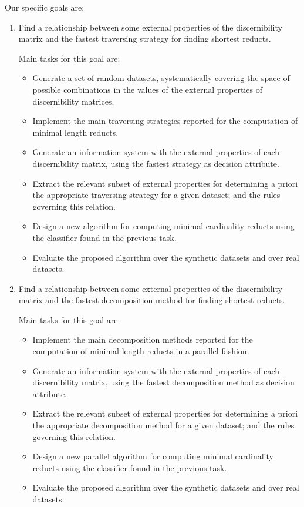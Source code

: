 \documentclass[11pt]{article}   %
\begin{document}
  Our specific goals are:
  \begin{enumerate}
  \item Find a relationship between some external properties of the discernibility matrix and the fastest 
  		traversing strategy for finding shortest reducts.
  		
  		Main tasks for this goal are:
  		\begin{itemize}
  		\item Generate a set of random datasets, systematically covering the space of possible combinations in 
  			  the values of the external properties of discernibility matrices.
  		\item Implement the main traversing strategies reported for the computation of minimal length reducts.
  		\item Generate an information system with the external properties of each discernibility matrix, using 
  			  the fastest strategy as decision attribute.
  		\item Extract the relevant subset of external properties for determining a priori the appropriate 
  			  traversing strategy for a given dataset; and the rules governing this relation.
  		\item Design a new algorithm for computing minimal cardinality reducts using the classifier found in
  			  the previous task.
  		\item Evaluate the proposed algorithm over the synthetic datasets and over real datasets.
  		\end{itemize}
  	
  \item Find a relationship between some external properties of the discernibility matrix and the fastest 
  		decomposition method for finding shortest reducts.
  		
  		Main tasks for this goal are:
  		\begin{itemize}
  		\item Implement the main decomposition methods reported for the computation of minimal length reducts
  			  in a parallel fashion.
  		\item Generate an information system with the external properties of each discernibility matrix, using 
  			  the fastest decomposition method as decision attribute.
  		\item Extract the relevant subset of external properties for determining a priori the appropriate 
  			  decomposition method for a given dataset; and the rules governing this relation.
  		\item Design a new parallel algorithm for computing minimal cardinality reducts using the classifier 
  			  found in the previous task.
  		\item Evaluate the proposed algorithm over the synthetic datasets and over real datasets.
  		\end{itemize}
  

\end{enumerate}
\end{document}
